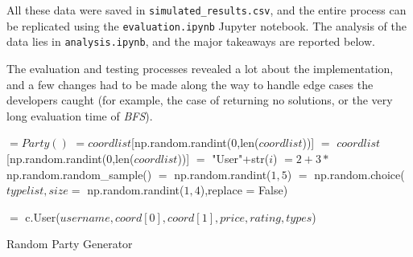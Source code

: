 \documentclass[11pt]{article}
\begin{document}
All these data were saved in \texttt{simulated\_results.csv}, and the entire process can be replicated using the \texttt{evaluation.ipynb} Jupyter notebook. The analysis of the data lies in \texttt{analysis.ipynb}, and the major takeaways are reported below.

The evaluation and testing processes revealed a lot about the implementation, and a few changes had to be made along the way to handle edge cases the developers caught (for example, the case of returning no solutions, or the very long evaluation time of \textit{BFS}).

\begin{algorithm}[h!]
    \begin{algorithmic}
         \gets[NY coords]
         \gets[types]
         $= Party()$
         \gets[]
             $=coordlist$[np.random.randint($0$,len($coordlist$))]
               $=$ $coordlist$[np.random.randint($0$,len($coordlist$))]
            \EndWhile
             $=$ "User"+str($i$)
             $= 2 + 3*$np.random.random_sample()
             $=$ np.random.randint($1,5$)
             $=$ np.random.choice($typelist,size =$ np.random.randint($1,4$),replace = False)
            
            
             $=$ c.User($username, coord[0], coord[1], price, rating, types$) 
        \EndFor
    \end{algorithmic}
    \caption{Random Party Generator}
\end{algorithm}
\end{document}
